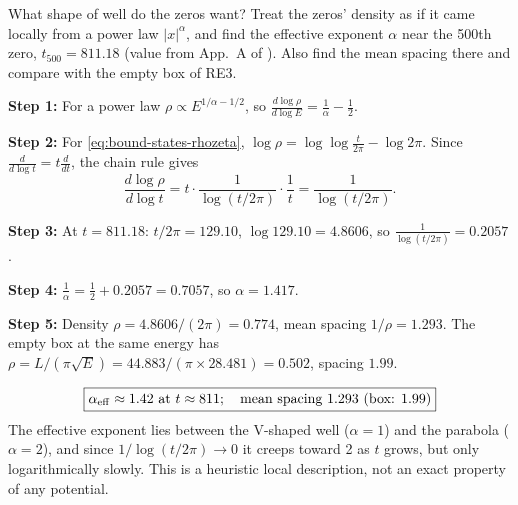 \begin{sample}{What shape of well do the zeros want?}
Treat the zeros' density as if it came locally from a power law $|x|^\alpha$, and find the effective exponent $\alpha$ near the 500th zero, $t_{500}=811.18$ (value from App.~A of \cite{soniR1}). Also find the mean spacing there and compare with the empty box of RE3.

\textbf{Step 1:} For a power law $\rho\propto E^{1/\alpha-1/2}$, so $\frac{d\log\rho}{d\log E}=\frac1\alpha-\frac12$.

\textbf{Step 2:} For \cref{eq:bound-states-rhozeta}, $\log\rho=\log\log\frac{t}{2\pi}-\log2\pi$. Since $\frac{d}{d\log t}=t\frac{d}{dt}$, the chain rule gives
\[
\frac{d\log\rho}{d\log t}=t\cdot\frac{1}{\log(t/2\pi)}\cdot\frac1t=\frac{1}{\log(t/2\pi)} .
\]

\textbf{Step 3:} At $t=811.18$: $t/2\pi=129.10$, $\log129.10=4.8606$, so $\frac{1}{\log(t/2\pi)}=0.2057$.

\textbf{Step 4:} $\frac1\alpha=\frac12+0.2057=0.7057$, so $\alpha=1.417$.

\textbf{Step 5:} Density $\rho=4.8606/(2\pi)=0.774$, mean spacing $1/\rho=1.293$. The empty box at the same energy has $\rho=L/(\pi\sqrt E)=44.883/(\pi\times28.481)=0.502$, spacing $1.99$.

\[
\boxed{\alpha_{\rm eff}\approx1.42 \text{ at } t\approx811;\quad \text{mean spacing } 1.293 \text{ (box: } 1.99)}
\]
The effective exponent lies between the V-shaped well ($\alpha=1$) and the parabola ($\alpha=2$), and since $1/\log(t/2\pi)\to0$ it creeps toward 2 as $t$ grows, but only logarithmically slowly. This is a heuristic local description, not an exact property of any potential.
\end{sample}

